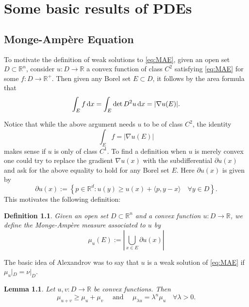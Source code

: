 \documentclass[twoside, 12pt]{book}
\numberwithin{equation}{chapter}
\def\theequation{\arabic{chapter}.\arabic{equation}}
\newtheorem{lemma}[theorem]{Lemma}
\newtheorem{definition}[theorem]{Definition}
\def\mR{{\mathbb R}}
\def\geq{\geqslant}
\def\p{\partial}
\def\d{\text{\rm{d}}}
\begin{document}
	
	
	
	
	\chapter{Some basic results of  PDEs} 
	
	\section{Monge-Ampère Equation}\label{app:MAE}
     \setcounter{equation}{0}
     \renewcommand\theequation{B.\arabic{equation}}
	To motivate the definition of weak solutions to \eqref{eq:MAE}, given an open set $D \subset \mathbb{R}^n$, consider $u: D \rightarrow \mathbb{R}$ a convex function of class $C^2$ satisfying \eqref{eq:MAE} 
	for some $f: D \rightarrow \mathbb{R}^{+}$. Then given any Borel set $E \subset D$, it follows by the area formula that
	$$
	\int_E f \,\d x=\int_E \operatorname{det} D^2 u\, \d x=|\nabla u(E)| .
	$$
	
	Notice that while the above argument needs $u$ to be of class $C^2$, the identity
	$$
	\int_E f=|\nabla u(E)|
	$$
	makes sense if $u$ is only of class $C^1$. To find a definition when $u$ is merely convex one could try to replace the gradient $\nabla u(x)$ with the subdifferential $\partial u(x)$ and ask for the above equality to hold for any Borel set $E$. Here $\p u(x)$ is given by 
	$$
	\partial u(x):=\left\{p \in \mathbb{R}^d: u(y) \geq u(x)+\langle p, y-x\rangle \quad \forall y \in D\right\}. 
	$$
	This motivates the following definition:
	\begin{definition}
		Given an open set $D \subset \mathbb{R}^n$ and a convex function $u: D \rightarrow \mathbb{R}$, we define the Monge-Ampère measure associated to $u$ by
		$$
		\mu_u(E):=\left|\bigcup_{x \in E} \partial u(x)\right|
		$$
	\end{definition}
	The basic idea of Alexandrov was to say that $u$ is a weak solution
	of \eqref{eq:MAE} if $\mu_u|_{D}=\nu|_{D}$. 
	
	\begin{lemma}
		Let $u,v:D\to \mR$ be convex functions. Then 
		$$
		\mu_{u+v} \geq \mu_u+\mu_v \quad \text { and } \quad \mu_{\lambda u}=\lambda^n \mu_u \quad \forall \lambda>0 .
		$$
	\end{lemma}
	
	\medspace
	
\end{document}
